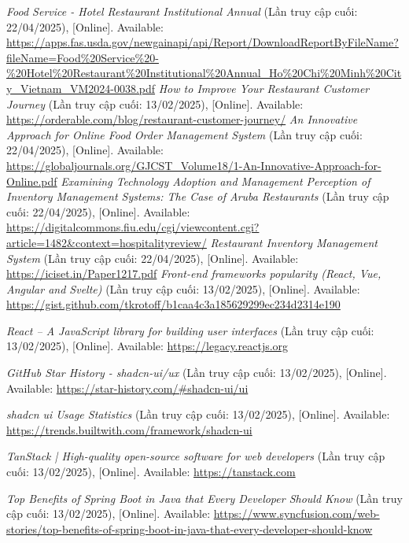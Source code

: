 \documentclass[12pt, a4paper]{article}
\begin{document}
\renewcommand{\refname}{\textbf{TÀI LIỆU THAM KHẢO}}
\begin{thebibliography}{}
	 \textit{Food Service - Hotel Restaurant Institutional Annual
	} (Lần truy cập cuối: 22/04/2025), [Online]. Available: \url{https://apps.fas.usda.gov/newgainapi/api/Report/DownloadReportByFileName?fileName=Food\%20Service%20-\%20Hotel\%20Restaurant%20Institutional\%20Annual_Ho\%20Chi\%20Minh\%20City_Vietnam_VM2024-0038.pdf}
	 \textit{How to Improve Your Restaurant Customer Journey
	} (Lần truy cập cuối: 13/02/2025), [Online]. Available: \url{https://orderable.com/blog/restaurant-customer-journey/}
	 \textit{An Innovative Approach for Online Food Order Management System} (Lần truy cập cuối: 22/04/2025), [Online]. Available: \url{https://globaljournals.org/GJCST_Volume18/1-An-Innovative-Approach-for-Online.pdf}
	 \textit{Examining Technology Adoption and Management Perception of Inventory Management Systems: The Case of Aruba Restaurants
	} (Lần truy cập cuối: 22/04/2025), [Online]. Available: \url{https://digitalcommons.fiu.edu/cgi/viewcontent.cgi?article=1482&context=hospitalityreview/}
	 \textit{Restaurant Inventory Management System
	} (Lần truy cập cuối: 22/04/2025), [Online]. Available: \url{https://iciset.in/Paper1217.pdf}
	 \textit{Front-end frameworks popularity (React, Vue, Angular and Svelte)} (Lần truy cập cuối: 13/02/2025), [Online]. Available: \url{https://gist.github.com/tkrotoff/b1caa4c3a185629299ec234d2314e190}

	 \textit{React – A JavaScript library for building user interfaces} (Lần truy cập cuối: 13/02/2025), [Online]. Available: \url{https://legacy.reactjs.org}

	 \textit{GitHub Star History - shadcn-ui/ux} (Lần truy cập cuối: 13/02/2025), [Online]. Available: \url{https://star-history.com/#shadcn-ui/ui}

	 \textit{shadcn ui Usage Statistics} (Lần truy cập cuối: 13/02/2025), [Online]. Available: \url{https://trends.builtwith.com/framework/shadcn-ui}

	 \textit{TanStack | High-quality open-source software for web developers} (Lần truy cập cuối: 13/02/2025), [Online]. Available: \url{https://tanstack.com}

	 \textit{Top Benefits of Spring Boot in Java that Every Developer Should Know} (Lần truy cập cuối: 13/02/2025), [Online]. Available: \url{https://www.syncfusion.com/web-stories/top-benefits-of-spring-boot-in-java-that-every-developer-should-know}


\end{thebibliography}
\end{document}
